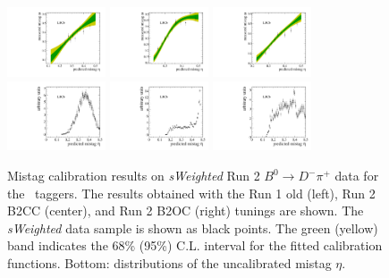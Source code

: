 \begin{figure}[hb!]
  \centering
  \includegraphics[width=0.26\textwidth]{04FlavourTagging/figs/OSelectronOpt/run1_tunings/OS_Electron_InputCalibration.pdf}
  \includegraphics[width=0.26\textwidth]{04FlavourTagging/figs/OSelectronOpt/run2b2cc_tunings/OS_Electron_InputCalibration.pdf}
  \includegraphics[width=0.26\textwidth]{04FlavourTagging/figs/OSelectronOpt/run2b2oc_tunings/OS_Electron_InputCalibration.pdf} \\
  \includegraphics[width=0.26\textwidth]{04FlavourTagging/figs/OSelectronOpt/run1_tunings/OS_Electron_EtaDist.pdf}
  \includegraphics[width=0.26\textwidth]{04FlavourTagging/figs/OSelectronOpt/run2b2cc_tunings/OS_Electron_EtaDist.pdf}
  \includegraphics[width=0.26\textwidth]{04FlavourTagging/figs/OSelectronOpt/run2b2oc_tunings/OS_Electron_EtaDist.pdf}
  \caption{Mistag calibration results on \emph{sWeighted} Run 2 $B^0\to D^-\pi^+$ data for the \OSe~taggers. The results obtained with the Run 1 old (left), Run 2 B2CC (center), and Run 2 B2OC (right) tunings are shown.
The \emph{sWeighted} data sample is shown as black points. The green (yellow) band indicates the 68\% (95\%) C.L. interval for the fitted calibration functions. Bottom: distributions of the uncalibrated mistag $\eta$.}
  \label{fig:OSePerfCalib3}
\end{figure}


